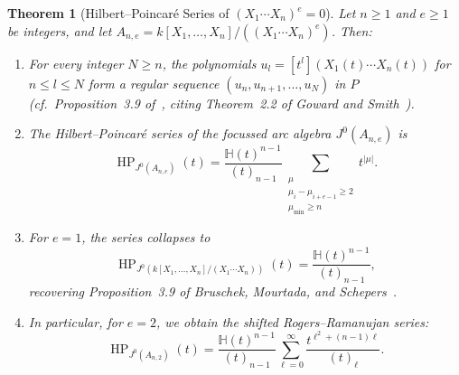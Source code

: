 \documentclass[a4paper, 12pt]{amsart}
\newtheorem{theorem}{Theorem}[section]
\theoremstyle{remark}
\begin{document}
\begin{theorem}[Hilbert--Poincaré Series of $(X_1 \cdots X_n)^e = 0$]
\label{thm:normal-crossings-notes}
Let $n \ge 1$ and $e \ge 1$ be integers,
and let $A_{n, e} = k[X_1, \dots, X_n] / ((X_1 \cdots X_n)^e)$.
Then:
\begin{enumerate}
  \item For every integer $N \ge n$,
  the polynomials $u_l = [t^l](X_1(t) \cdots X_n(t))$ for $n \le l \le N$ form a regular sequence $(u_n, u_{n + 1}, \dots, u_N)$ in $P$
  (cf.\ Proposition~3.9 of~\cite{bruschek_arc_2013},
  citing Theorem~2.2 of Goward and Smith~\cite{goward_smith_2006}).
  \item The Hilbert--Poincaré series of the focussed arc algebra $J^0(A_{n, e})$ is
  \begin{equation}
    \label{eq:HP-normal-crossings}
    \operatorname{HP}_{J^0(A_{n, e})}(t) = \frac{\mathbb{H}(t)^{n - 1}}{(t)_{n - 1}} \sum_{\substack{\mu \\ \mu_i - \mu_{i + e - 1} \ge 2 \\ \mu_{\mathrm{min}} \ge n}} t^{|\mu|}.
  \end{equation}
  \item For $e = 1$,
  the series collapses to
  \begin{equation}
    \label{eq:HP-normal-crossings-n1}
    \operatorname{HP}_{J^0(k[X_1, \dots, X_n] / (X_1 \cdots X_n))}(t) = \frac{\mathbb{H}(t)^{n - 1}}{(t)_{n - 1}},
  \end{equation}
  recovering Proposition~3.9 of Bruschek, Mourtada, and Schepers~\cite{bruschek_arc_2013}.
  \item In particular,
  for $e = 2$,
  we obtain the shifted Rogers--Ramanujan series:
  \begin{equation}
    \label{eq:HP-normal-crossings-n2}
    \operatorname{HP}_{J^0(A_{n, 2})}(t) = \frac{\mathbb{H}(t)^{n - 1}}{(t)_{n - 1}} \sum_{\ell = 0}^\infty \frac{t^{\ell^2 + (n - 1)\ell}}{(t)_\ell}.
  \end{equation}
\end{enumerate}
\end{theorem}
\end{document}

